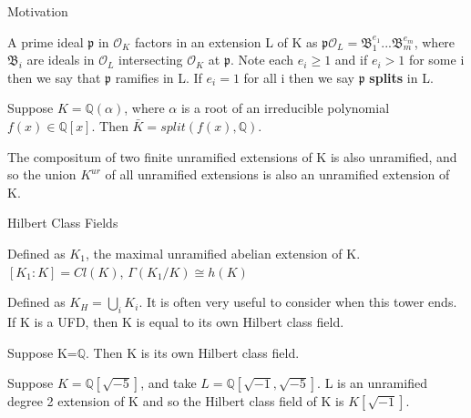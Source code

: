 \documentclass[10pt]{beamer}
\theoremstyle{plain} %
\begin{document}
\begin{frame}{Motivation}
\begin{definition}[Ramification]
A prime ideal $\mathfrak{p}$ in $\mathcal{O}_K$ factors in an extension L of K as
$\mathfrak{p}\mathcal{O}_L=\mathfrak{B}_1^{e_1}...\mathfrak{B}_m^{e_m}$, where $\mathfrak{B}_i$ are ideals in $\mathcal{O}_L$ intersecting $\mathcal{O}_K$ at $\mathfrak{p}$. Note each $e_i\geq1$ and if $e_i>1$ for some i then we say that $\mathfrak{p}$ ramifies in L. If $e_i=1$ for all i then we say $\mathfrak{p}$ \textbf{splits} in L.
\end{definition}
\begin{theorem}
  Suppose $K=\mathbb{Q}(\alpha)$, where $\alpha$ is a root of an irreducible polynomial $f(x) \in \mathbb{Q}[x]$. Then $\bar{K} = split(f(x),\mathbb{Q})$.
\end{theorem}
    \begin{theorem}
The compositum of two finite unramified extensions of K is also unramified, and so the union $K^{ur}$ of all unramified extensions is also an unramified extension of K.
\end{theorem}

\end{frame}
\begin{frame}{Hilbert Class Fields}
\begin{definition}
Defined as $K_1$, the maximal unramified abelian extension of K. $[K_1:K]=Cl(K)$, $\Gamma(K_1/K)\cong h(K)$
\end{definition}
  \begin{definition}
Defined as $K_H=\bigcup_{i}K_{i}$. It is often very useful to consider when this tower ends. If K is a UFD, then K is equal to its own Hilbert class field.  
\end{definition}
    \begin{example}
    Suppose K=$\mathbb{Q}$. Then K is its own Hilbert class field. 
\end{example}
\begin{example}
    Suppose $K=\mathbb{Q}[\sqrt{-5}]$, and take $L=\mathbb{Q}[\sqrt{-1},\sqrt{-5}]$. L is an unramified degree 2 extension of K and so the Hilbert class field of K is $K[\sqrt{-1}]$.
\end{example}

\end{frame}
\end{document}
